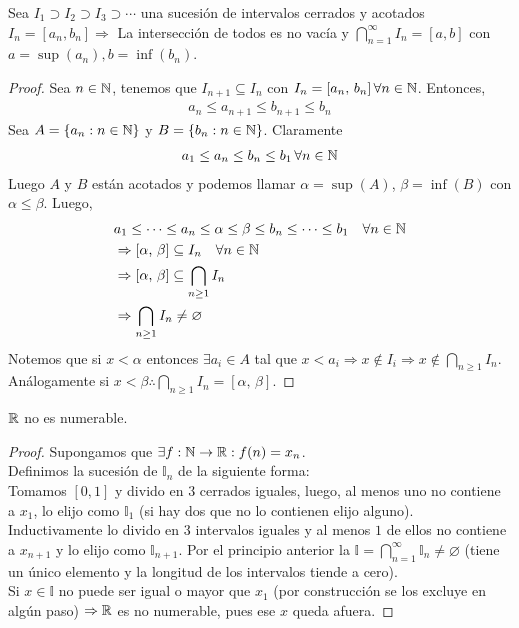 \begin{theorem}
	Sea \(I_1 \supset I_2 \supset I_3 \supset \cdots \) una sucesión de intervalos cerrados y acotados \(I_n = [a_n, b_n] \Rightarrow \)
	La intersección de todos es no vacía y \(\bigcap_{n=1}^{\infty} I_n = [a,b]\) con \(a = \sup(a_n), b=\inf(b_n)\).
	\begin{proof}
		Sea \(n \in \mathbb{N} \), tenemos que \(I_{n+1} \subseteq I_n\) con \(I_n = [a_n\text{, } b_n] \, \forall n \in \mathbb{N} \). Entonces, \begin{align*}
			a_n \leq a_{n+1} \leq b_{n+1} \leq b_n
		\end{align*}
		Sea \(A = \{ a_n : n \in \mathbb{N} \} \) y \(B = \{ b_n : n \in \mathbb{N} \} \). Claramente \begin{align*}
			a_1 \leq a_n \leq b_n \leq b_1 \, \forall n \in \mathbb{N}
		\end{align*}
		Luego \(A\) y \(B\) están acotados y podemos llamar \(\alpha = \sup(A)\), \(\beta = \inf(B)\) con \(\alpha \leq \beta \). Luego, \begin{align*}
			 & a_1 \leq \cdots \leq a_n \leq \alpha \leq \beta \leq b_n \leq \cdots \leq b_1 \quad \forall n \in \mathbb{N} \\
			 & \Rightarrow [\alpha\text{, }\beta] \subseteq I_n \quad \forall n \in \mathbb{N}                              \\
			 & \Rightarrow [\alpha\text{, }\beta] \subseteq \bigcap_{n \geq 1} I_n                                  \\
			 & \Rightarrow \bigcap_{n \geq 1} I_n \neq \varnothing
		\end{align*}
		Notemos que si \(x < \alpha \) entonces \(\exists a_i \in A\) tal que \(x < a_i \Rightarrow x \notin I_i \Rightarrow x \notin \bigcap_{n \geq 1} I_n\).
		Análogamente si \(x < \beta \therefore \bigcap_{n \geq 1} I_n = [\alpha\text{, }\beta]\).
	\end{proof}
\end{theorem}

\begin{theorem}
	\(\mathbb{R} \)  no es numerable.
	\begin{proof}
		Supongamos que \(\exists f:\mathbb{N} \to \mathbb{R} : f(n) = x_n\). \\
		Definimos la sucesión de \(\mathbb{I}_n\) de la siguiente forma: \\
		Tomamos \([0, 1]\) y divido en \(3\) cerrados iguales, luego, al menos uno no contiene a \(x_1\), lo elijo como \(\mathbb{I}_1\) (si  hay dos que no lo contienen elijo alguno). Inductivamente lo divido en \(3\) intervalos iguales y al menos \(1\) de ellos no contiene a \(x_{n+1} \) y lo elijo como \(\mathbb{I}_{n+1} \). Por el principio anterior la \(\mathbb{I} = \bigcap_{n=1}^\infty \mathbb{I}_n \neq \varnothing \) (tiene un único elemento y la longitud de los intervalos tiende a cero). \\
		Si \(x \in \mathbb{I} \) no puede ser igual o mayor que \(x_1\) (por construcción se los excluye en algún paso) \(\Rightarrow \mathbb{R} \) es no numerable, pues ese \(x\) queda afuera.
	\end{proof}
\end{theorem}

